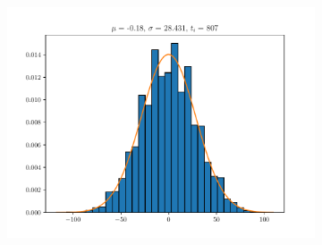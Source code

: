 \documentclass{article}
\begin{document}
\begin{figure}
\begin{subfigure}{.3\textwidth}
\end{subfigure}
\begin{subfigure}{.3\textwidth}
  \centering
  \includegraphics[width=1.1\linewidth]{hist3.pdf}
\end{subfigure}
\newline


\end{figure}
\end{document}
